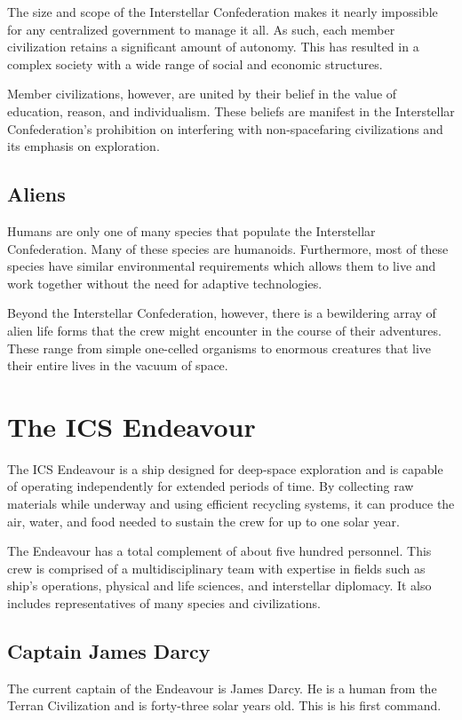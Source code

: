 \documentclass[11pt, a5paper, parskip=half-, DIV=12]{scrartcl}
\begin{document}
The size and scope of the Interstellar Confederation makes it nearly impossible for any centralized government to manage it all. As such, each member civilization retains a significant amount of autonomy. This has resulted in a complex society with a wide range of social and economic structures.

Member civilizations, however, are united by their belief in the value of education, reason, and individualism. These beliefs are manifest in the Interstellar Confederation's prohibition on interfering with non-spacefaring civilizations and its emphasis on exploration.

\subsection*{Aliens}
Humans are only one of many species that populate the Interstellar Confederation. Many of these species are humanoids. Furthermore, most of these species have similar environmental requirements which allows them to live and work together without the need for adaptive technologies.

Beyond the Interstellar Confederation, however, there is a bewildering array of alien life forms that the crew might encounter in the course of their adventures. These range from simple one-celled organisms to enormous creatures that live their entire lives in the vacuum of space.

\newpage

\section*{The ICS Endeavour}
The ICS Endeavour is a ship designed for deep-space exploration and is capable of operating independently for extended periods of time. By collecting raw materials while underway and using efficient recycling systems, it can produce the air, water, and food needed to sustain the crew for up to one solar year.

The Endeavour has a total complement of about five hundred personnel. This crew is comprised of a multidisciplinary team with expertise in fields such as ship's operations, physical and life sciences, and interstellar diplomacy. It also includes representatives of many species and civilizations.

\subsection*{Captain James Darcy}
The current captain of the Endeavour is James Darcy. He is a human from the Terran Civilization and is forty-three solar years old. This is his first command.
\end{document}
